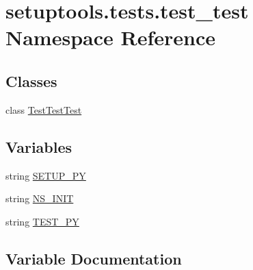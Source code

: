 \hypertarget{namespacesetuptools_1_1tests_1_1test__test}{}\section{setuptools.\+tests.\+test\+\_\+test Namespace Reference}
\label{namespacesetuptools_1_1tests_1_1test__test}
\subsection*{Classes}
\begin{DoxyCompactItemize}
\item 
class \hyperlink{classsetuptools_1_1tests_1_1test__test_1_1TestTestTest}{Test\+Test\+Test}
\end{DoxyCompactItemize}
\subsection*{Variables}
\begin{DoxyCompactItemize}
\item 
string \hyperlink{namespacesetuptools_1_1tests_1_1test__test_a734cce3f7b803024a0c11e8fbac796eb}{S\+E\+T\+U\+P\+\_\+\+P\+Y}
\item 
string \hyperlink{namespacesetuptools_1_1tests_1_1test__test_ad741122b3e5cbf21fa109afd6e9f25a1}{N\+S\+\_\+\+I\+N\+I\+T}
\item 
string \hyperlink{namespacesetuptools_1_1tests_1_1test__test_ab3539ee847634899ab0d0909bdd1eccc}{T\+E\+S\+T\+\_\+\+P\+Y}
\end{DoxyCompactItemize}


\subsection{Variable Documentation}
\hypertarget{namespacesetuptools_1_1tests_1_1test__test_ad741122b3e5cbf21fa109afd6e9f25a1}{}
